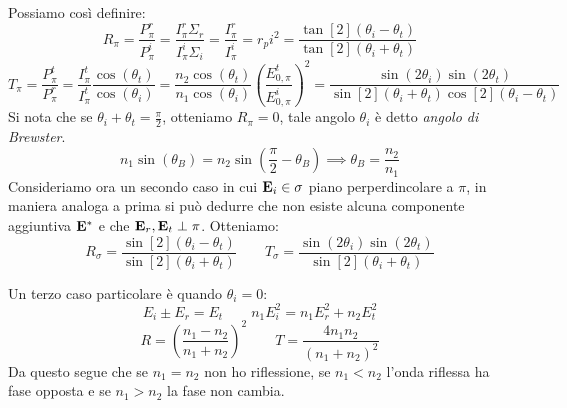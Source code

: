 \documentclass[12pt,a4paper]{article}
\begin{document}
Possiamo così definire:
\begin{equation*}
    R_\pi= \frac{P_\pi^r}{P_\pi^i}= \frac{I_\pi^r\Sigma_r}{I_\pi^i\Sigma_i}= \frac{I_\pi^r}{I_\pi^i}= r_pi^2 = \frac{\tan[2](\theta_i-\theta_t)}{\tan[2](\theta_i+\theta_t)}
\end{equation*}
\begin{equation*}
    T_\pi= \frac{P_\pi^t}{P_\pi^r} = \frac{I_\pi^t}{I_\pi^t}\frac{\cos(\theta_t)}{\cos(\theta_i)}= \frac{n_2\cos(\theta_t)}{n_1\cos(\theta_i)}
    \left( \frac{E_{0,\pi}^t}{E_{0,\pi}^i} \right)^2= \frac{\sin(2\theta_i)\sin(2\theta_t)}{\sin[2](\theta_i+\theta_t)\cos[2](\theta_i-\theta_t)}
\end{equation*}
Si nota che se $\theta_i+\theta_t= \frac{\pi}{2}$, otteniamo $R_\pi= 0$, tale angolo $\theta_i$ è detto \textit{angolo di Brewster}.
\begin{equation*}
    n_1\sin(\theta_B)= n_2\sin(\frac{\pi}{2}-\theta_B)\implies \theta_B=\frac{n_2}{n_1}
\end{equation*}
Consideriamo ora un secondo caso in cui $\vb{E}_i \in \sigma$ piano perperdincolare a $\pi$, in maniera analoga a prima si può dedurre che non esiste 
alcuna componente aggiuntiva $\vb{E}^*$ e che $\vb{E}_r, \vb{E}_t \perp \pi$. Otteniamo:
\begin{equation*}
    R_\sigma=\frac{\sin[2](\theta_i-\theta_t)}{\sin[2](\theta_i+\theta_t)} \qquad T_\sigma= \frac{\sin(2\theta_i)\sin(2\theta_t)}{\sin[2](\theta_i+\theta_t)}
\end{equation*}

Un terzo caso particolare è quando $\theta_i= 0$:
\begin{equation*}
    E_i\pm E_r= E_t\qquad n_1E_i^2= n_1E_r^2+n_2E_t^2
\end{equation*}
\begin{equation*}
    R=\left( \frac{n_1-n_2}{n_1+n_2} \right)^2 \qquad  T= \frac{4n_1n_2}{(n_1+n_2)^2} 
\end{equation*}
Da questo segue che se $n_1= n_2$ non ho riflessione, se $n_1<n_2$ l'onda riflessa ha fase opposta e se $n_1>n_2$ la fase non cambia.
\end{document}
